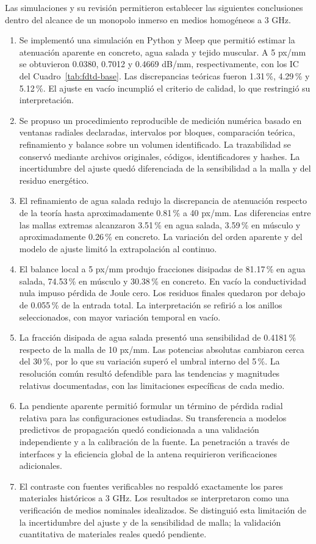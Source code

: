 Las simulaciones y su revisión permitieron establecer las siguientes conclusiones dentro del alcance de un monopolo inmerso en medios homogéneos a 3 GHz.
\begin{enumerate}
\item Se implementó una simulación en Python y Meep que permitió estimar la atenuación aparente en concreto, agua salada y tejido muscular. A 5 px/mm se obtuvieron 0.0380, 0.7012 y 0.4669 dB/mm, respectivamente, con los IC del Cuadro~\ref{tab:fdtd-base}. Las discrepancias teóricas fueron 1.31\,\%, 4.29\,\% y 5.12\,\%. El ajuste en vacío incumplió el criterio de calidad, lo que restringió su interpretación.
\item Se propuso un procedimiento reproducible de medición numérica basado en ventanas radiales declaradas, intervalos por bloques, comparación teórica, refinamiento y balance sobre un volumen identificado. La trazabilidad se conservó mediante archivos originales, códigos, identificadores y hashes. La incertidumbre del ajuste quedó diferenciada de la sensibilidad a la malla y del residuo energético.
\item El refinamiento de agua salada redujo la discrepancia de atenuación respecto de la teoría hasta aproximadamente 0.81\,\% a 40 px/mm. Las diferencias entre las mallas extremas alcanzaron 3.51\,\% en agua salada, 3.59\,\% en músculo y aproximadamente 0.26\,\% en concreto. La variación del orden aparente y del modelo de ajuste limitó la extrapolación al continuo.
\item El balance local a 5 px/mm produjo fracciones disipadas de 81.17\,\% en agua salada, 74.53\,\% en músculo y 30.38\,\% en concreto. En vacío la conductividad nula impuso pérdida de Joule cero. Los residuos finales quedaron por debajo de 0.055\,\% de la entrada total. La interpretación se refirió a los anillos seleccionados, con mayor variación temporal en vacío.
\item La fracción disipada de agua salada presentó una sensibilidad de 0.4181\,\% respecto de la malla de 10 px/mm. Las potencias absolutas cambiaron cerca del 30\,\%, por lo que su variación superó el umbral interno del 5\,\%. La resolución común resultó defendible para las tendencias y magnitudes relativas documentadas, con las limitaciones específicas de cada medio.
\item La pendiente aparente permitió formular un término de pérdida radial relativa para las configuraciones estudiadas. Su transferencia a modelos predictivos de propagación quedó condicionada a una validación independiente y a la calibración de la fuente. La penetración a través de interfaces y la eficiencia global de la antena requirieron verificaciones adicionales.
\item El contraste con fuentes verificables no respaldó exactamente los pares materiales históricos a 3 GHz. Los resultados se interpretaron como una verificación de medios nominales idealizados. Se distinguió esta limitación de la incertidumbre del ajuste y de la sensibilidad de malla; la validación cuantitativa de materiales reales quedó pendiente.
\end{enumerate}


